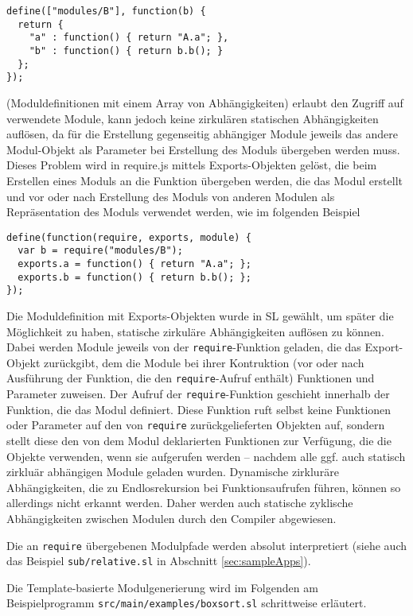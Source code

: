 \documentclass[runningheads]{llncs}
\begin{document}
\begin{verbatim}
define(["modules/B"], function(b) {
  return {
    "a" : function() { return "A.a"; },
    "b" : function() { return b.b(); }
  };
});
\end{verbatim}

(Moduldefinitionen mit einem Array von Abhängigkeiten) erlaubt den
Zugriff auf verwendete Module, kann jedoch keine zirkulären
statischen Abhängigkeiten auflösen, da
für die Erstellung gegenseitig abhängiger Module jeweils das
andere Modul-Objekt als Parameter bei Erstellung des Moduls übergeben
werden muss. Dieses Problem wird in require.js mittels
Exports-Objekten gelöst, die beim Erstellen eines Moduls an die Funktion
übergeben werden, die das Modul erstellt und vor oder nach Erstellung
des Moduls von anderen Modulen als Repräsentation des Moduls verwendet
werden, wie im folgenden Beispiel

\begin{verbatim}
define(function(require, exports, module) {
  var b = require("modules/B");
  exports.a = function() { return "A.a"; };
  exports.b = function() { return b.b(); };
});
\end{verbatim}

Die Moduldefinition mit Exports-Objekten wurde in SL
gewählt, um später die Möglichkeit zu haben, statische zirkuläre
Abhängigkeiten auflösen zu können. Dabei werden Module jeweils von
der \texttt{require}-Funktion geladen, die das Export-Objekt
zurückgibt, dem die Module bei ihrer Kontruktion (vor oder nach
Ausführung der Funktion, die den \texttt{require}-Aufruf enthält)
Funktionen und Parameter zuweisen. Der Aufruf der
\texttt{require}-Funktion geschieht innerhalb der Funktion, die das
Modul definiert. Diese Funktion ruft selbst keine Funktionen oder
Parameter auf den von \texttt{require} zurückgelieferten Objekten auf,
sondern stellt diese den von dem Modul deklarierten Funktionen zur
Verfügung, die die Objekte verwenden, wenn sie aufgerufen werden --
nachdem alle ggf. auch statisch zirkluär abhängigen Module geladen
wurden. Dynamische zirkluräre Abhängigkeiten, die zu Endlosrekursion
bei Funktionsaufrufen führen, können so allerdings nicht erkannt
werden. Daher werden auch statische zyklische Abhängigkeiten zwischen
Modulen durch den Compiler abgewiesen.

Die an \texttt{require} übergebenen Modulpfade werden absolut
interpretiert (siehe auch das Beispiel \texttt{sub/relative.sl} in
Abschnitt \ref{sec:sampleApps}).

Die Template-basierte Modulgenerierung wird im Folgenden am
Beispielprogramm \texttt{src/main/examples/boxsort.sl} schrittweise
erläutert.
\end{document}

